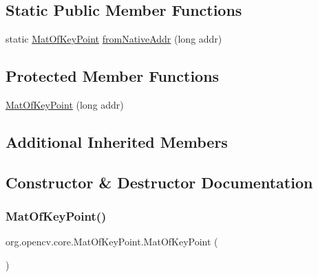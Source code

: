 \subsection*{Static Public Member Functions}
\begin{DoxyCompactItemize}
\item 
static \mbox{\hyperlink{classorg_1_1opencv_1_1core_1_1_mat_of_key_point}{Mat\+Of\+Key\+Point}} \mbox{\hyperlink{classorg_1_1opencv_1_1core_1_1_mat_of_key_point_a8d861eda5f1d344da01f70410db97927}{from\+Native\+Addr}} (long addr)
\end{DoxyCompactItemize}
\subsection*{Protected Member Functions}
\begin{DoxyCompactItemize}
\item 
\mbox{\hyperlink{classorg_1_1opencv_1_1core_1_1_mat_of_key_point_a2a63668f381a1e1b92979503718dd4e2}{Mat\+Of\+Key\+Point}} (long addr)
\end{DoxyCompactItemize}
\subsection*{Additional Inherited Members}


\subsection{Constructor \& Destructor Documentation}
\mbox{\label{classorg_1_1opencv_1_1core_1_1_mat_of_key_point_af7ca86a3acb35d7f9264a7b35186ef8d}} 
\subsubsection{\texorpdfstring{Mat\+Of\+Key\+Point()}{MatOfKeyPoint()}\hspace{0.1cm}{\footnotesize\ttfamily [1/4]}}
{\footnotesize\ttfamily org.\+opencv.\+core.\+Mat\+Of\+Key\+Point.\+Mat\+Of\+Key\+Point (\begin{DoxyParamCaption}{ }\end{DoxyParamCaption})}

